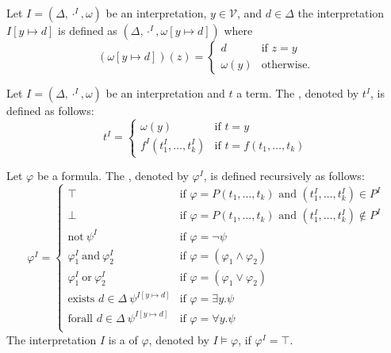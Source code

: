 Let $I=(\Delta,\cdot^I,\omega)$ be an interpretation, $y\in\mathcal{V}$, and $d\in\Delta$ the interpretation $I\left[y\mapsto d\right]$ is defined as $(\Delta,\cdot^I,\omega\left[y\mapsto d\right])$ where
\[(\omega\left[y\mapsto d\right])(z)=
	\begin{cases}
		d         & \text{if $z=y$}   \\
		\omega(y) & \text{otherwise.} 
	\end{cases}\]
\begin{definition}\label{def.2.22}
	Let $I=(\Delta,\cdot^I,\omega)$ be an interpretation and $t$ a term. The , denoted by $t^I$, is defined as follows:
	\[t^I=
		\begin{cases}
			\omega(y)              & \text{if $t=y$}                \\
			f^I(t^I_1,\dots,t^I_k) & \text{if $t=f(t_1,\dots,t_k)$} 
		\end{cases}\]
		
	Let $\varphi$ be a formula. The , denoted by $\varphi^I$, is defined recursively as follows:
	\[\varphi^I=
		\begin{cases}
			\top                                                   & \text{if $\varphi=P(t_1,\dots,t_k)$ and $(t^I_1,\dots,t^I_k)\in P^I$}    \\
			\bot                                                   & \text{if $\varphi=P(t_1,\dots,t_k)$ and $(t^I_1,\dots,t^I_k)\notin P^I$} \\
			\text{not}~\psi^I                                      & \text{if $\varphi=\neg\psi$}                                             \\
			\varphi^I_1~\text{and}~\varphi^I_2                     & \text{if $\varphi=(\varphi_1\wedge\varphi_2)$}                           \\
			\varphi^I_1~\text{or}~\varphi^I_2                      & \text{if $\varphi=(\varphi_1\vee\varphi_2)$}                             \\
			\text{exists $d\in\Delta$}~\psi^{I\left[y\mapsto d\right]} & \text{if $\varphi=\exists y.\psi$}                                        \\
			\text{forall $d\in\Delta$}~\psi^{I\left[y\mapsto d\right]} & \text{if $\varphi=\forall y.\psi$}                                        \\
		\end{cases}\]
	The interpretation $I$ is a  of $\varphi$, denoted by $I\models\varphi$, if $\varphi^I=\top$.
\end{definition}
